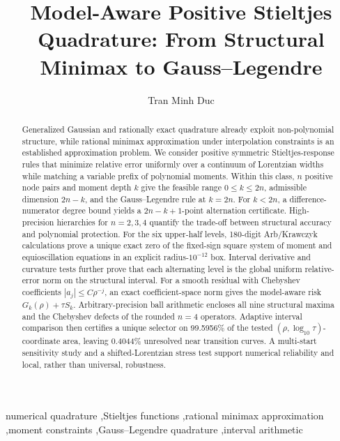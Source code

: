 \documentclass[preprint,12pt]{elsarticle}
\theoremstyle{remark}
\begin{document}
\begin{frontmatter}

\title{Model-Aware Positive Stieltjes Quadrature:
From Structural Minimax to Gauss--Legendre}

\author[inst1]{Tran Minh Duc}


\begin{abstract}
Generalized Gaussian and rationally exact quadrature already exploit
non-polynomial structure, while rational minimax approximation under
interpolation constraints is an established approximation problem. We
consider positive symmetric Stieltjes-response rules that minimize
relative error uniformly over a continuum of Lorentzian widths while
matching a variable prefix of polynomial moments. Within this class,
\(n\) positive node pairs and moment depth \(k\) give the feasible range
\(0\leq k\leq2n\), admissible dimension \(2n-k\), and the
Gauss--Legendre rule at \(k=2n\). For \(k<2n\), a
difference-numerator degree bound yields a \(2n-k+1\)-point
alternation certificate. High-precision hierarchies for \(n=2,3,4\)
quantify the trade-off between structural accuracy and polynomial
protection. For the six upper-half levels, 180-digit Arb/Krawczyk
calculations prove a unique exact zero of the fixed-sign square system of moment and
equioscillation equations in an explicit radius-\(10^{-12}\)
box. Interval derivative and curvature tests further prove that each
alternating level is the global uniform relative-error norm on the
structural interval. For a smooth residual with Chebyshev coefficients
\(|a_j|\leq C\rho^{-j}\), an exact coefficient-space norm gives the
model-aware risk \(G_k(\rho)+\tau S_k\). Arbitrary-precision ball
arithmetic encloses all nine structural maxima and the Chebyshev
defects of the rounded \(n=4\) operators. Adaptive interval comparison
then certifies a unique selector on 99.5956\% of the
tested \((\rho,\log_{10}\tau)\)-coordinate area, leaving
0.4044\% unresolved near transition curves. A
multi-start sensitivity study and a shifted-Lorentzian stress test
support numerical reliability and local, rather than universal,
robustness.
\end{abstract}

\begin{keyword}
numerical quadrature \sep Stieltjes functions \sep rational minimax
approximation \sep moment constraints \sep Gauss--Legendre quadrature
\sep interval arithmetic
\end{keyword}

\end{frontmatter}
\end{document}
